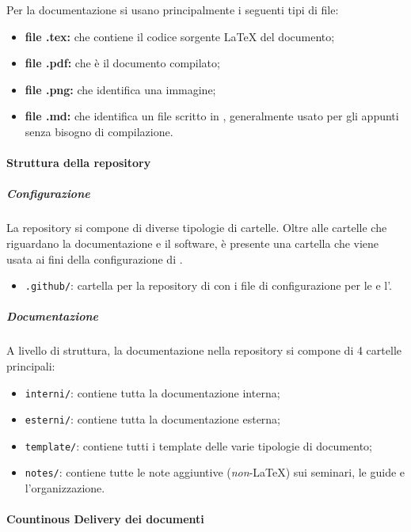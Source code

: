 			Per la documentazione si usano principalmente i seguenti tipi di file:
			\begin{itemize}
				\item \textbf{file .tex:} che contiene il codice sorgente \LaTeX{} del documento;
				\item \textbf{file .pdf:} che è il documento compilato; 
				\item \textbf{file .png:} che identifica una immagine;
				\item \textbf{file .md:} che identifica un file scritto in , generalmente usato per gli appunti senza bisogno di compilazione.
			\end{itemize}

		\paragraph{Struttura della repository}

		\subparagraph{Configurazione}

		La repository si compone di diverse tipologie di cartelle. Oltre alle cartelle che riguardano la documentazione e il software, è presente una cartella che viene usata ai fini della configurazione di .
		\begin{itemize}
			\item \verb!.github/!: cartella per la repository di  con i file di configurazione per le  e l'.
		\end{itemize}

		\subparagraph{Documentazione}

		A livello di struttura, la documentazione nella repository si compone di 4 cartelle principali:
		\begin{itemize}
			\item \verb!interni/!: contiene tutta la documentazione interna;
			\item \verb!esterni/!: contiene tutta la documentazione esterna;
			\item \verb!template/!: contiene tutti i template delle varie tipologie di documento;
			\item \verb!notes/!: contiene tutte le note aggiuntive (\textit{non}-\LaTeX{}) sui seminari, le guide e l'organizzazione.
		\end{itemize}

		\paragraph{Countinous Delivery dei documenti}

